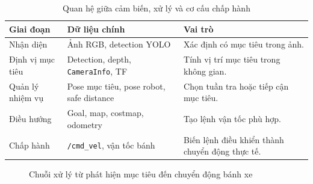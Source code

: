 \begin{table}[H]
    \centering
    \caption{Quan hệ giữa cảm biến, xử lý và cơ cấu chấp hành}
    \label{tab:sensor-actuator-relation}
    \renewcommand{\arraystretch}{1.25}
    \small
    \begin{tabularx}{\textwidth}{|>{\raggedright\arraybackslash}p{}|>{\raggedright\arraybackslash}p{}|>{\raggedright\arraybackslash}X|}
        \hline
        \textbf{Giai đoạn} & \textbf{Dữ liệu chính} & \textbf{Vai trò} \\
        \hline
        Nhận diện & Ảnh RGB, detection YOLO & Xác định có mục tiêu trong ảnh. \\
        \hline
        Định vị mục tiêu & Detection, depth, \texttt{CameraInfo}, TF & Tính vị trí mục tiêu trong không gian. \\
        \hline
        Quản lý nhiệm vụ & Pose mục tiêu, pose robot, safe distance & Chọn tuần tra hoặc tiếp cận mục tiêu. \\
        \hline
        Điều hướng & Goal, map, costmap, odometry & Tạo lệnh vận tốc phù hợp. \\
        \hline
        Chấp hành & \texttt{/cmd\_vel}, vận tốc bánh & Biến lệnh điều khiển thành chuyển động thực tế. \\
        \hline
    \end{tabularx}
\end{table}

\begin{figure}[H]
\centering
{}
\caption{Chuỗi xử lý từ phát hiện mục tiêu đến chuyển động bánh xe}
\label{fig:detection-to-wheel-motion}
\end{figure}

